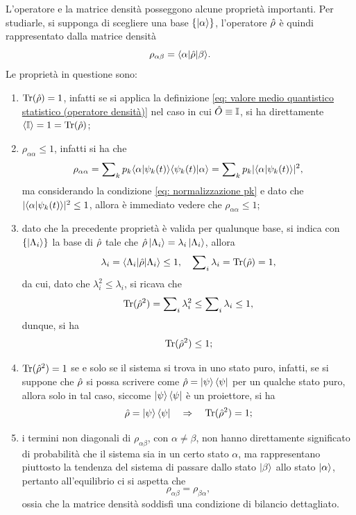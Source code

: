 L'operatore e la matrice densità posseggono alcune proprietà importanti. Per studiarle, si supponga di scegliere una base $\{\ket{\alpha}\}$, l'operatore $\hat{\rho}$ è quindi rappresentato dalla matrice densità
\begin{equation}
    \rho_{\alpha\beta} = \langle \alpha | \hat{\rho} | \beta \rangle.
\end{equation}
Le proprietà in questione sono:
\begin{enumerate}
    \item $\mathrm{Tr}(\hat{\rho}) = 1$, infatti se si applica la definizione \eqref{eq: valore medio quantistico statistico (operatore densità)} nel caso in cui $\hat{O} \equiv \mathbb{I}$, si ha direttamente $\langle \mathbb{I} \rangle = 1 = \mathrm{Tr}(\hat{\rho})$;
    \item $\rho_{\alpha\alpha} \le 1$, infatti si ha che
    \begin{equation}
        \rho_{\alpha\alpha} = \sum\nolimits_k p_k\langle \alpha | \psi_k(t) \rangle\langle \psi_k(t) | \alpha \rangle = \sum\nolimits_k p_k |\langle \alpha | \psi_k(t) \rangle|^2,
    \end{equation}
    ma considerando la condizione \eqref{eq: normalizzazione pk} e dato che $|\langle \alpha | \psi_k(t) \rangle|^2 \le 1$, allora è immediato vedere che $\rho_{\alpha\alpha} \le 1$;
    \item dato che la precedente proprietà è valida per qualunque base, si indica con $\{\ket{\Lambda_i}\}$ la base di $\hat{\rho}$ tale che $\hat{\rho}\ket{\Lambda_i} = \lambda_i\ket{\Lambda_i}$, allora 
    \begin{equation}
        \lambda_i = \langle \Lambda_i | \hat{\rho} | \Lambda_i \rangle \le 1,\quad \sum\nolimits_i\lambda_i = \mathrm{Tr}(\hat{\rho}) = 1,
    \end{equation}
    da cui, dato che $\lambda_i^2 \le \lambda_i$, si ricava che
    \begin{equation}
        \mathrm{Tr}(\hat{\rho}^2) = \sum\nolimits_i\lambda_i^2 \le \sum\nolimits_i\lambda_i \le 1,
    \end{equation}
    dunque, si ha
    \begin{equation}
        \mathrm{Tr}(\hat{\rho}^2) \le 1;
    \end{equation}
    \item $\mathrm{Tr}(\hat{\rho}^2) = 1$ se e solo se il sistema si trova in uno stato puro, infatti, se si suppone che $\hat{\rho}$ si possa scrivere come $\hat{\rho} = \ket{\psi}\bra{\psi}$ per un qualche stato puro, allora solo in tal caso, siccome $\ket{\psi}\bra{\psi}$ è un proiettore, si ha
    \begin{equation}
        \hat{\rho} = \ket{\psi}\bra{\psi} \quad\Rightarrow\quad \mathrm{Tr}(\hat{\rho}^2) = 1;
    \end{equation}
    \item i termini non diagonali di $\rho_{\alpha\beta}$, con $\alpha \neq \beta$, non hanno direttamente significato di probabilità che il sistema sia in un certo stato $\alpha$, ma rappresentano piuttosto la tendenza del sistema di passare dallo stato $\ket{\beta}$ allo stato $\ket{\alpha}$, pertanto all'equilibrio ci si aspetta che 
    \begin{equation}
        \rho_{\alpha\beta} = \rho_{\beta\alpha},
    \end{equation}
    ossia che la matrice densità soddisfi una condizione di bilancio dettagliato.
\end{enumerate}
